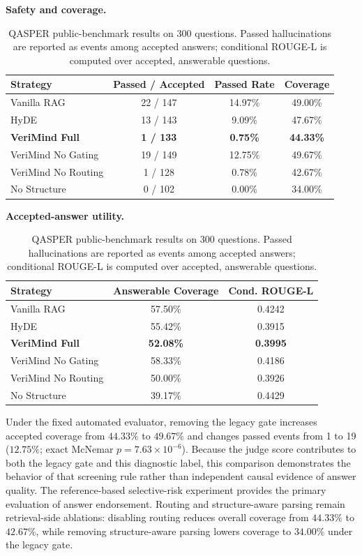 \documentclass[smallextended]{svjour3}
\begin{document}
\begin{table}[htbp]
\centering
\caption{QASPER public-benchmark results on 300 questions. Passed hallucinations are reported as events among accepted answers; conditional ROUGE-L is computed over accepted, answerable questions.}
\label{tab:qasper_results}
\renewcommand{\arraystretch}{1.15}
\small
\setlength{\tabcolsep}{6pt}
\textbf{Safety and coverage.}\\[2pt]
\begin{tabular}{@{}lccc@{}}
\toprule
\textbf{Strategy} & \textbf{Passed / Accepted} & \textbf{Passed Rate} & \textbf{Coverage} \\
\midrule
Vanilla RAG & 22 / 147 & 14.97\% & 49.00\% \\
HyDE & 13 / 143 & 9.09\% & 47.67\% \\
\rowcolor{gray!10}
\textbf{VeriMind Full} & \textbf{1 / 133} & \textbf{0.75\%} & \textbf{44.33\%} \\
VeriMind No Gating & 19 / 149 & 12.75\% & 49.67\% \\
VeriMind No Routing & 1 / 128 & 0.78\% & 42.67\% \\
No Structure & 0 / 102 & 0.00\% & 34.00\% \\
\bottomrule
\end{tabular}

\vspace{0.45em}
\textbf{Accepted-answer utility.}\\[2pt]
\begin{tabular}{@{}lcc@{}}
\toprule
\textbf{Strategy} & \textbf{Answerable Coverage} & \textbf{Cond. ROUGE-L} \\
\midrule
Vanilla RAG & 57.50\% & 0.4242 \\
HyDE & 55.42\% & 0.3915 \\
\rowcolor{gray!10}
\textbf{VeriMind Full} & \textbf{52.08\%} & \textbf{0.3995} \\
VeriMind No Gating & 58.33\% & 0.4186 \\
VeriMind No Routing & 50.00\% & 0.3926 \\
No Structure & 39.17\% & 0.4429 \\
\bottomrule
\end{tabular}
\end{table}

Under the fixed automated evaluator, removing the legacy gate increases accepted coverage from $44.33\%$ to $49.67\%$ and changes passed events from 1 to 19 ($12.75\%$; exact McNemar $p=7.63\times10^{-6}$). Because the judge score contributes to both the legacy gate and this diagnostic label, this comparison demonstrates the behavior of that screening rule rather than independent causal evidence of answer quality. The reference-based selective-risk experiment provides the primary evaluation of answer endorsement. Routing and structure-aware parsing remain retrieval-side ablations: disabling routing reduces overall coverage from $44.33\%$ to $42.67\%$, while removing structure-aware parsing lowers coverage to $34.00\%$ under the legacy gate.
\end{document}
